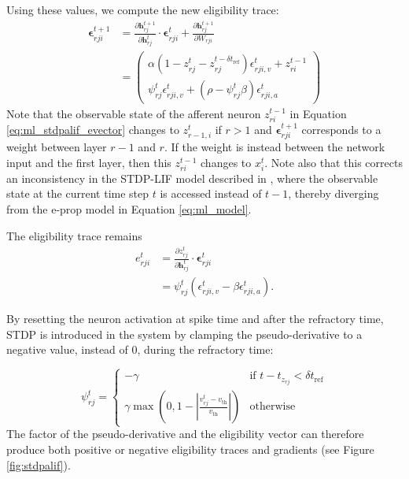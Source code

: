 	        Using these values, we compute the new eligibility trace:
	        \begin{align}
	        \bm{\epsilon}^{t+1}_{rji} &= \frac{\partial\mathbf{h}^{t+1}_{rj}}{\partial\mathbf{h}^t_{rj}}\cdot\bm{\epsilon}^t_{rji} + \frac{\partial\mathbf{h}^{t+1}_{rj}}{\partial W_{rji}}\\
	        &= \begin{pmatrix}
	        \alpha\left(1 - z^t_{rj} - z_{rj}^{t-\delta t_\text{ref}}\right)\epsilon_{rji, v}^t + z_{ri}^{t-1}\\
	        \psi^t_{rj}\epsilon^t_{rji, v} + \left(\rho - \psi^t_{rj}\beta\right)\epsilon^t_{rji,a}
	        \end{pmatrix}\label{eq:ml_stdpalif_evector}
	        \end{align}
	        Note that the observable state of the afferent neuron $z_{ri}^{t-1}$ in Equation \ref{eq:ml_stdpalif_evector} changes to $z_{r-1, i}^t$ if $r > 1$ and $\bm{\epsilon}^{t+1}_{rji}$ corresponds to a weight between layer $r-1$ and $r$.
	        If the weight is instead between the network input and the first layer, then this $z_{ri}^{t-1}$ changes to $x^t_i$.
	        Note also that this corrects an inconsistency in the STDP-LIF model described in \citet{traub2020learning}, where the observable state at the current time step $t$ is accessed instead of $t-1$, thereby diverging from the e-prop model in Equation \ref{eq:ml_model}.

	        The eligibility trace remains
	        \begin{align}
	        e^{t}_{rji} &= \frac{\partial z^{t}_{rj}}{\partial\mathbf{h}^{t}_{rj}} \cdot \bm{\epsilon}^{t}_{rji}\\
	        &= \psi^t_{rj}\left(\epsilon^t_{rji, v} - \beta\epsilon^t_{rji, a}\right).
	        \end{align}

	        By resetting the neuron activation at spike time and after the refractory time, STDP is introduced in the system by clamping the pseudo-derivative to a negative value, instead of 0, during the refractory time:

	        \begin{equation}
	        \psi^t_{rj} = \begin{cases}
	        -\gamma&\mbox{if } t - t_{z_{rj}} < \delta t_\text{ref}\\
	        \gamma\max\left(0, 1 - \left|\frac{v^t_{rj}-v_\text{th}}{v_\text{th}}\right|\right)&\mbox{otherwise}
	        \end{cases}
	        \end{equation}
	        The factor of the pseudo-derivative and the eligibility vector can therefore produce both positive or negative eligibility traces and gradients (see Figure \ref{fig:stdpalif}).

